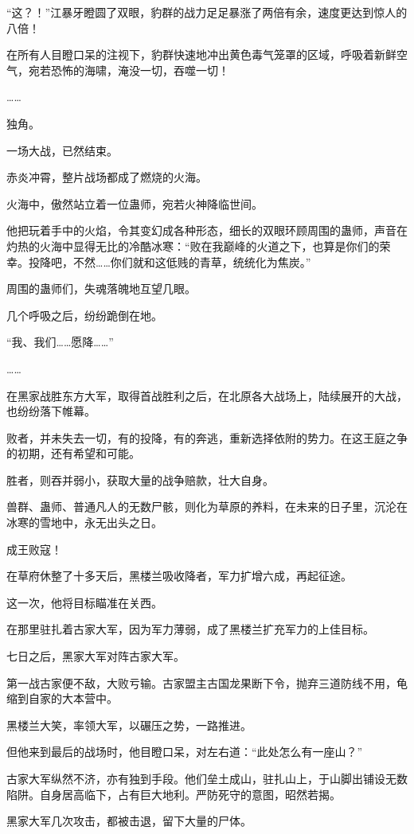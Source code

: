 \begin{this_body}
“这？！”江暴牙瞪圆了双眼，豹群的战力足足暴涨了两倍有余，速度更达到惊人的八倍！

在所有人目瞪口呆的注视下，豹群快速地冲出黄色毒气笼罩的区域，呼吸着新鲜空气，宛若恐怖的海啸，淹没一切，吞噬一切！

……

独角。

一场大战，已然结束。

赤炎冲霄，整片战场都成了燃烧的火海。

火海中，傲然站立着一位蛊师，宛若火神降临世间。

他把玩着手中的火焰，令其变幻成各种形态，细长的双眼环顾周围的蛊师，声音在灼热的火海中显得无比的冷酷冰寒：“败在我巅峰的火道之下，也算是你们的荣幸。投降吧，不然……你们就和这低贱的青草，统统化为焦炭。”

周围的蛊师们，失魂落魄地互望几眼。

几个呼吸之后，纷纷跪倒在地。

“我、我们……愿降……”

……

在黑家战胜东方大军，取得首战胜利之后，在北原各大战场上，陆续展开的大战，也纷纷落下帷幕。

败者，并未失去一切，有的投降，有的奔逃，重新选择依附的势力。在这王庭之争的初期，还有希望和可能。

胜者，则吞并弱小，获取大量的战争赔款，壮大自身。

兽群、蛊师、普通凡人的无数尸骸，则化为草原的养料，在未来的日子里，沉沦在冰寒的雪地中，永无出头之日。

成王败寇！

在草府休整了十多天后，黑楼兰吸收降者，军力扩增六成，再起征途。

这一次，他将目标瞄准在关西。

在那里驻扎着古家大军，因为军力薄弱，成了黑楼兰扩充军力的上佳目标。

七日之后，黑家大军对阵古家大军。

第一战古家便不敌，大败亏输。古家盟主古国龙果断下令，抛弃三道防线不用，龟缩到自家的大本营中。

黑楼兰大笑，率领大军，以碾压之势，一路推进。

但他来到最后的战场时，他目瞪口呆，对左右道：“此处怎么有一座山？”

古家大军纵然不济，亦有独到手段。他们垒土成山，驻扎山上，于山脚出铺设无数陷阱。自身居高临下，占有巨大地利。严防死守的意图，昭然若揭。

黑家大军几次攻击，都被击退，留下大量的尸体。


\end{this_body}
